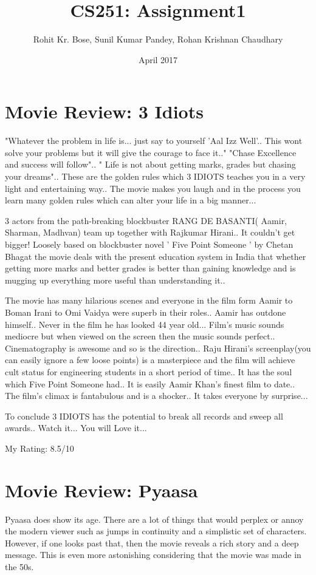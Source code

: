 \documentclass{article}
\title{CS251: Assignment1}
\author{Rohit Kr. Bose, Sunil Kumar Pandey, Rohan Krishnan Chaudhary }
\date{April 2017}
\begin{document}
\maketitle

\section{Movie Review: 3 Idiots}
"Whatever the problem in life is... just say to yourself 'Aal Izz Well'.. This wont solve your problems but it will give the courage to face it.." "Chase Excellence and success will follow".. " Life is not about getting marks, grades but chasing your dreams".. These are the golden rules which 3 IDIOTS teaches you in a very light and entertaining way.. The movie makes you laugh and in the process you learn many golden rules which can alter your life in a big manner...

3 actors from the path-breaking blockbuster RANG DE BASANTI( Aamir, Sharman, Madhvan) team up together with Rajkumar Hirani.. It couldn't get bigger! Loosely based on blockbuster novel ' Five Point Someone ' by Chetan Bhagat the movie deals with the present education system in India that whether getting more marks and better grades is better than gaining knowledge and is mugging up everything more useful than understanding it..

The movie has many hilarious scenes and everyone in the film form Aamir to Boman Irani to Omi Vaidya were superb in their roles.. Aamir has outdone himself.. Never in the film he has looked 44 year old... Film's music sounds mediocre but when viewed on the screen then the music sounds perfect.. Cinematography is awesome and so is the direction.. Raju Hirani's screenplay(you can easily ignore a few loose points) is a masterpiece and the film will achieve cult status for engineering students in a short period of time.. It has the soul which Five Point Someone had.. It is easily Aamir Khan's finest film to date.. The film's climax is fantabulous and is a shocker.. It takes everyone by surprise...

To conclude 3 IDIOTS has the potential to break all records and sweep all awards.. Watch it... You will Love it...

My Rating: 8.5/10
\section{Movie Review: Pyaasa}

Pyaasa does show its age. There are a lot of things that would perplex or annoy the modern viewer such as jumps in continuity and a simplistic set of characters. However, if one looks past that, then the movie reveals a rich story and a deep message. This is even more astonishing considering that the movie was made in the 50s.
\end{document}
